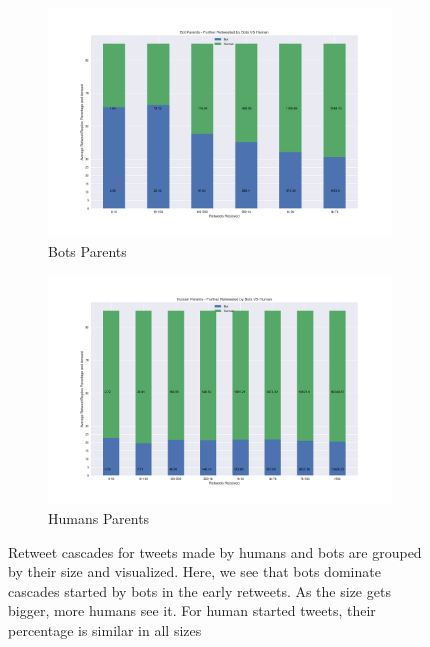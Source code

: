 \documentclass[letterpaper]{article}
\begin{document}
\begin{figure}[H]
    \centering
    \begin{subfigure}[b]{1\linewidth}
      \includegraphics[width=\linewidth]{images/bots_furtherretweeted.png}
      \caption{Bots Parents}
      \label{fig:further_retweet_bots}
    \end{subfigure}
    \begin{subfigure}[b]{1\linewidth}
      \includegraphics[width=\linewidth]{images/humans_furtherretweeted.png}
      \caption{Humans Parents}
      \label{fig:further_retweet_humans}
    \end{subfigure}
    \caption{Retweet cascades for tweets made by humans and bots are grouped by their size and visualized. Here, we see 
    that bots dominate cascades started by bots in the early retweets. As the size gets bigger, more humans see it. For 
    human started tweets, their percentage is similar in all sizes}
    \label{fig:further_retweet}
\end{figure}
\end{document}
